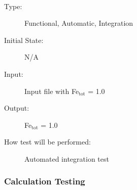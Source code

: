 \documentclass[12pt, titlepage]{article}
\newcounter{testnum} %
\begin{document}
\begin{addmargin}[2em]{0em}
\\
\begin{addmargin}[2em]{0em}
\begin{description}
\item[Type:] Functional, Automatic, Integration
					
\item[Initial State:] N/A
					
\item[Input:] Input file with Fe$_{\text{tot}}$ = 1.0\\
					
\item[Output:] Fe$_{\text{tot}}$ = 1.0
					
\item[How test will be performed:] Automated integration test\\
\end{description}
\end{addmargin}
\end{addmargin}



\subsubsection{Calculation Testing}
\end{document}

